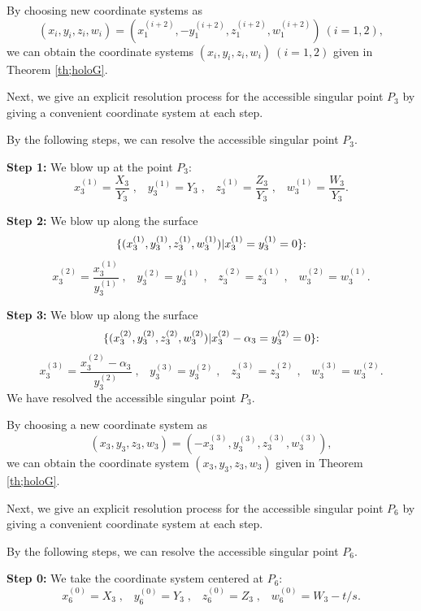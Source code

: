 By choosing new coordinate systems as
$$
(x_i,y_i,z_i,w_i)=(x_{1}^{(i+2)},-y_{1}^{(i+2)},z_{1}^{(i+2)},w_{1}^{(i+2)}) \ (i=1,2),
$$
we can obtain the coordinate systems $(x_i,y_i,z_i,w_i) \ (i=1,2)$ given in Theorem \ref{th;holoG}.

Next, we give an explicit resolution process for the accessible singular point $P_3$ by giving a convenient coordinate system at each step.

By the following steps, we can resolve the accessible singular point $P_3$.

{\bf Step 1:} We blow up at the point $P_3${\rm : \rm}
$$
{x_{3}^{(1)}}=\frac{X_3}{Y_3} \;, \;\;\; {y_{3}^{(1)}}=Y_3 \;, \;\;\; {z_{3}^{(1)}}=\frac{Z_3}{Y_3} \;, \;\;\; {w_{3}^{(1)}}=\frac{W_3}{Y_3}.
$$


{\bf Step 2:} We blow up along the surface
\begin{equation*}
\{(x_{3}^{(1)},y_{3}^{(1)},z_{3}^{(1)},w_{3}^{(1)})|x_{3}^{(1)}=y_{3}^{(1)}=0\}{\rm : \rm}
\end{equation*}
$$
{x_{3}^{(2)}}=\frac{x_{3}^{(1)}}{y_{3}^{(1)}} \;, \;\;\; {y_{3}^{(2)}}=y_{3}^{(1)} \;, \;\;\; {z_{3}^{(2)}}=z_{3}^{(1)} \;, \;\;\; {w_{3}^{(2)}}=w_{3}^{(1)}.
$$


{\bf Step 3:} We blow up along the surface
\begin{equation*}
\{(x_{3}^{(2)},y_{3}^{(2)},z_{3}^{(2)},w_{3}^{(2)})|x_{3}^{(2)}-\alpha_3=y_{3}^{(2)}=0\}{\rm : \rm}
\end{equation*}
$$
{x_{3}^{(3)}}=\frac{x_{3}^{(2)}-\alpha_3}{y_{3}^{(2)}} \;, \;\;\; {y_{3}^{(3)}}=y_{3}^{(2)} \;, \;\;\; {z_{3}^{(3)}}=z_{3}^{(2)} \;, \;\;\; {w_{3}^{(3)}}=w_{3}^{(2)}.
$$
We have resolved the accessible singular point $P_3$.

By choosing a new coordinate system as
$$
(x_3,y_3,z_3,w_3)=(-x_{3}^{(3)},y_{3}^{(3)},z_{3}^{(3)},w_{3}^{(3)}),
$$
we can obtain the coordinate system $(x_3,y_3,z_3,w_3)$ given in Theorem \ref{th;holoG}.



Next, we give an explicit resolution process for the accessible singular point $P_6$ by giving a convenient coordinate system at each step.

By the following steps, we can resolve the accessible singular point $P_6$.

{\bf Step 0:} We take the coordinate system centered at $P_6${\rm : \rm}
$$
{x_{6}^{(0)}}=X_3 \;, \;\;\; {y_{6}^{(0)}}=Y_3 \;, \;\;\; {z_{6}^{(0)}}=Z_3 \;, \;\;\; {w_{6}^{(0)}}=W_3-t/s.
$$




